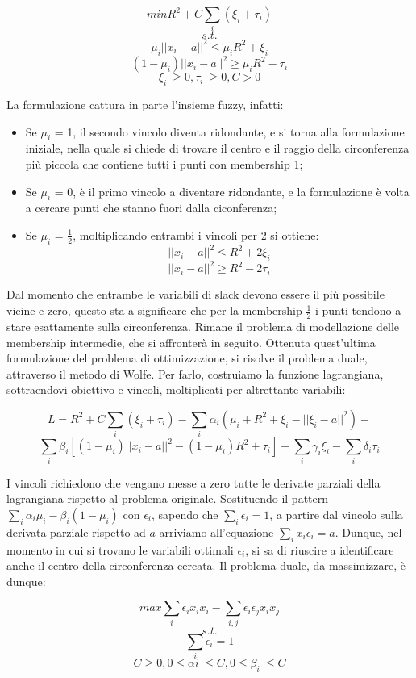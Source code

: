 \documentclass[12pt,a4paper]{report}
\begin{document}
\[ min R^2 + C\sum_{i} (\xi_{i} + \tau_{i})\]
\[s.t.\]
\[ \mu_i||x_i - a||^2  \leq \mu_i R^2 + \xi_{i}\]
\[ (1 - \mu_i)||x_i - a||^2  \geq \mu_i R^2 - \tau_{i}\]
\[ \xi_{i}\ \geq 0, \tau_{i}\ \geq 0 ,  C > 0\]

La formulazione cattura in parte l'insieme fuzzy, infatti:
\begin{itemize}
  \item Se  $\mu_i$ = 1, il secondo vincolo diventa ridondante, e si torna alla formulazione iniziale, nella quale si chiede di trovare il centro  e il raggio della circonferenza più piccola che contiene tutti i punti con membership 1;
  \item Se   $\mu_i$ = 0, è il primo vincolo a diventare ridondante, e la formulazione è volta a cercare punti che stanno fuori dalla ciconferenza;
  \item Se   $\mu_i$ = $\frac{1}{2}$, moltiplicando entrambi i vincoli per 2 si ottiene:
\[ ||x_i - a||^2  \leq R^2 + 2\xi_{i}\]
\[ ||x_i - a||^2  \geq R^2 - 2\tau_{i}\]
\end{itemize}

Dal momento che entrambe le variabili di slack devono essere il più possibile vicine e zero, questo sta a significare che per la membership  $\frac{1}{2}$ i punti tendono a stare esattamente sulla circonferenza. Rimane il problema di modellazione delle membership intermedie, che si affronterà in seguito.
Ottenuta quest'ultima formulazione del problema di ottimizzazione, si risolve il problema duale, attraverso il metodo di Wolfe. Per farlo, costruiamo la funzione lagrangiana, sottraendovi obiettivo e vincoli, moltiplicati per altrettante variabili:

\[ L = R^2 + C\sum_{i}(\xi_i + \tau_i) - \sum_{i}\alpha_i(\mu_i+R^2 + \xi_i - ||\xi_i - a||^2) -\] 
\[\sum_{i}\beta_i[(1- \mu_i)||x_i - a||^2 - (1 - \mu_i)R^2 + \tau_i] -  \sum_{i}\gamma_i\xi_i - \sum_{i}\delta_i\tau_i\]

I vincoli richiedono che vengano messe a zero tutte le derivate parziali della lagrangiana rispetto al problema originale. Sostituendo il pattern $\sum_{i}\alpha_i\mu_i - \beta_i(1-\mu_i)$ con $\epsilon_i$, sapendo che $\sum_{i}\epsilon_i = 1$, a partire dal vincolo sulla derivata parziale rispetto ad $a$ arriviamo all'equazione  $\sum_{i}x_i\epsilon_i = a$. Dunque, nel momento in cui si trovano le variabili ottimali $\epsilon_i$, si sa di riuscire a identificare anche il centro della circonferenza cercata.
Il problema duale, da massimizzare, è dunque:

\[ max \sum_{i}\epsilon_ix_ix_i - \sum_{i,j}\epsilon_i\epsilon_jx_ix_j\]
\[s.t.\]
\[\sum_i\epsilon_i = 1\]
\[ C \geq 0, 0 \leq \alpha{i}\ \leq C , 0 \leq \beta_{i}\ \leq C \]
\end{document}
